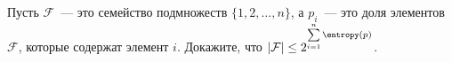 Пусть $\mathcal{F}$~--- это семейство подмножеств $\{1, 2, \dots, n\}$, а $p_i$~--- это доля элементов
$\mathcal{F}$, которые содержат элемент $i$. Докажите, что
$|\mathcal{F}| \le 2^{\sum\limits_{i = 1}^n \entropy(p)}$.
